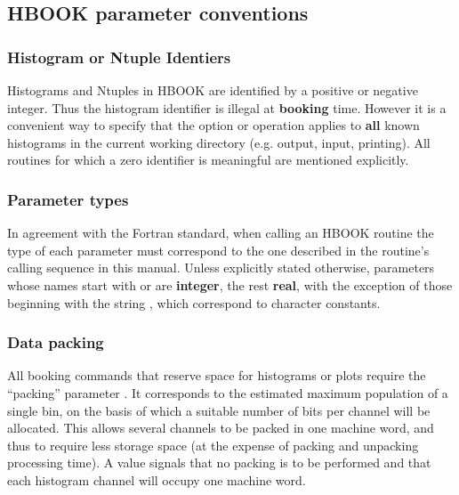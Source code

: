 \subsection{HBOOK parameter conventions}

\subsubsection*{Histogram or Ntuple Identiers}
 
Histograms and Ntuples in HBOOK are identified by a positive 
or negative integer.
Thus the histogram identifier  is illegal at {\bf booking} time.
However it is a convenient way to specify that the option or operation
applies to {\bf all} known histograms in the current
working directory (e.g. output, input, printing).
All routines for which a zero identifier is meaningful
are mentioned explicitly.

\subsubsection*{Parameter types}

In agreement with the Fortran standard, when calling an
HBOOK routine the type of each parameter must correspond to
the one described in the routine's calling sequence in this manual.
Unless explicitly stated otherwise, parameters whose  names
start with  or  are {\bf integer}, 
the rest {\bf real}, with the exception of those beginning 
with the string , which correspond to character constants. 

\subsubsection*{Data packing}

All booking commands that reserve space for histograms or plots
require the ``packing'' parameter .
It corresponds to the 
estimated maximum population of a single bin,
on the basis of which a suitable number of bits per channel will be
allocated.
This allows several channels to be packed in one machine word,
and thus to require less storage space (at the expense of packing
and unpacking processing time).
A value  signals that no packing is to be performed
and that each histogram channel will occupy one machine word.


